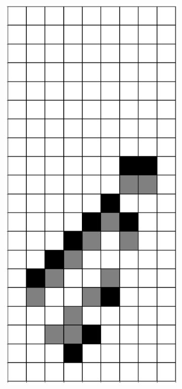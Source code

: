 \documentclass[12pt]{article}
\numberwithin{figure}{section} %
\begin{document}
\begin{figure}[H]
\begin{subfigure}{0.3\textwidth}
     \subcaption{}
   \end{subfigure}
     \begin{subfigure}{0.3\textwidth}
     \centering
     \includegraphics[angle=270,width=\linewidth]{Section4/22.1}

\end{subfigure}
\end{figure}
\end{document}
